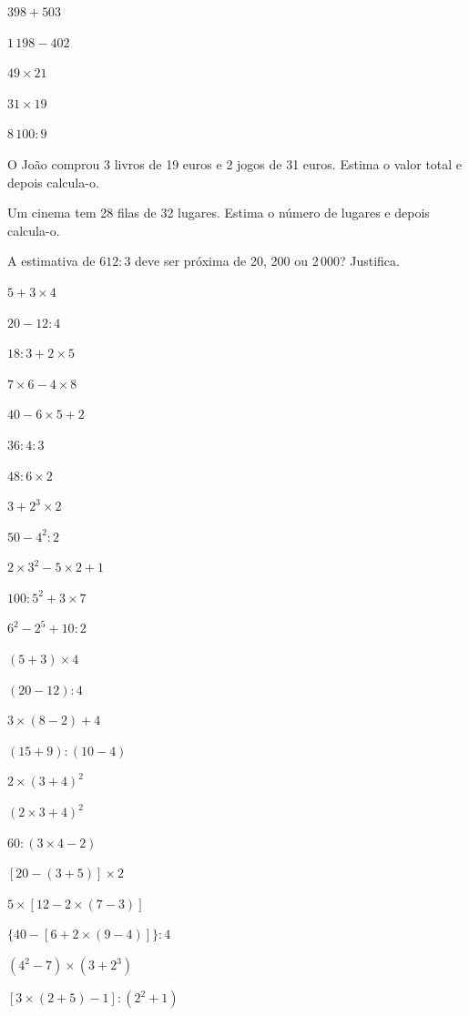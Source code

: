 \documentclass[12pt]{article}
\begin{document}
\begin{exercicios}
  \item $398 + 503$
  \item $1\,198 - 402$
  \item $49 \times 21$
  \item $31 \times 19$
  \item $8\,100 : 9$
  \item O João comprou 3 livros de 19 euros e 2 jogos de 31 euros. Estima o valor total e depois calcula-o.
  \item Um cinema tem 28 filas de 32 lugares. Estima o número de lugares e depois calcula-o.
  \item A estimativa de $612 : 3$ deve ser próxima de 20, 200 ou 2\,000? Justifica.
\end{exercicios}

\begin{exercicios}
  \item $5 + 3 \times 4$
  \item $20 - 12 : 4$
  \item $18 : 3 + 2 \times 5$
  \item $7 \times 6 - 4 \times 8$
  \item $40 - 6 \times 5 + 2$
  \item $36 : 4 : 3$
  \item $48 : 6 \times 2$
  \item $3 + 2^3 \times 2$
  \item $50 - 4^2 : 2$
  \item $2 \times 3^2 - 5 \times 2 + 1$
  \item $100 : 5^2 + 3 \times 7$
  \item $6^2 - 2^5 + 10 : 2$
\end{exercicios}

\begin{exercicios}
  \item $(5 + 3) \times 4$
  \item $(20 - 12) : 4$
  \item $3 \times (8 - 2) + 4$
  \item $(15 + 9) : (10 - 4)$
  \item $2 \times (3 + 4)^2$
  \item $(2 \times 3 + 4)^2$
  \item $60 : (3 \times 4 - 2)$
  \item $[20 - (3 + 5)] \times 2$
  \item $5 \times [12 - 2 \times (7 - 3)]$
  \item $\{40 - [6 + 2 \times (9 - 4)]\} : 4$
  \item $(4^2 - 7) \times (3 + 2^3)$
  \item $[3 \times (2 + 5) - 1] : (2^2 + 1)$
\end{exercicios}
\end{document}
